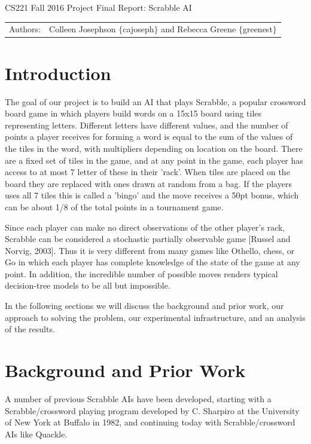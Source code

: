 \documentclass[12pt]{article}
\begin{document}
\begin{center}
{\Large CS221 Fall 2016 Project Final Report: Scrabble AI}

\begin{tabular}{rl}
  Authors: & Colleen Josephson $\{$cajoseph$\}$ and Rebecca Greene $\{$greenest$\}$\\
\end{tabular}
\end{center}


\section*{Introduction}
The goal of our project is to build an AI that plays Scrabble, a
popular crossword board game in which players build words on a 15x15
board using tiles representing letters. Different letters have
different values, and the number of points a player receives for
forming a word is equal to the sum of the values of the tiles in the
word, with multipliers depending on location on the board. There are a
fixed set of tiles in the game, and at any point in the game, each
player has access to at most 7 letter of these in their 'rack'.  When
tiles are placed on the board they are replaced with ones drawn at
random from a bag. If the players uses all 7 tiles this is called a
'bingo' and the move receives a 50pt bonus, which can be about 1/8 of
the total points in a tournament game.

Since each player can make no direct observations of the other
player's rack, Scrabble can be considered a stochastic partially
observable game [Russel and Norvig, 2003]. Thus it is very different
from many games like Othello, chess, or Go in which each player has
complete knowledge of the state of the game at any point. In addition,
the incredible number of possible moves renders typical decision-tree
models to be all but impossible.

In the following sections we will discuss the background and prior
work, our approach to solving the problem, our experimental
infrastructure, and an analysis of the results.\\

\section*{Background and Prior Work}

A number of previous Scrabble AIs have been developed, starting with a
Scrabble/crossword playing program developed by C. Sharpiro at the
University of New York at Buffalo in 1982, and continuing today with
Scrabble/crossword AIs like Quackle.
\end{document}
